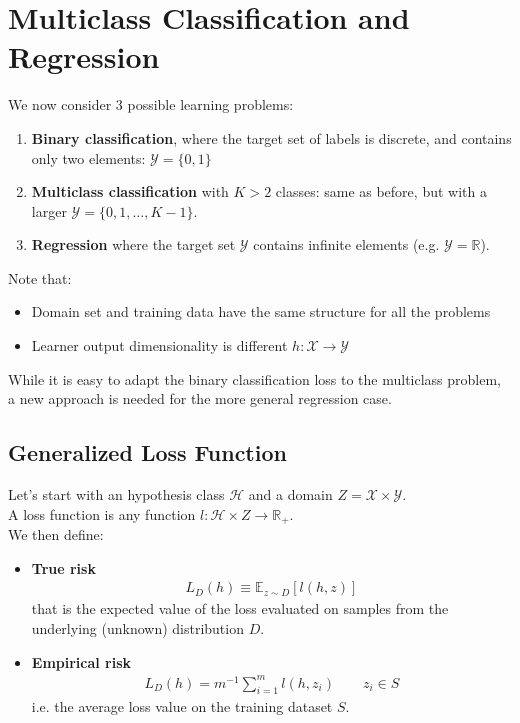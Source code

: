 \documentclass[../template.tex]{subfiles}
\begin{document}
\section{Multiclass Classification and Regression}
We now consider $3$ possible learning problems:
\begin{enumerate}
    \item \textbf{Binary classification}, where the target set of labels is discrete, and contains only two elements: $\mathcal{Y} = \{0,1\}$  
    \item \textbf{Multiclass classification} with $K>2$ classes: same as before, but with a larger $\mathcal{Y} = \{0, 1, \dots, K-1\}$.
    \item \textbf{Regression} where the target set $\mathcal{Y}$ contains infinite elements (e.g. $\mathcal{Y} = \mathbb{R}$).     
\end{enumerate}

Note that:
\begin{itemize}
    \item Domain set and training data have the same structure for all the problems
    \item Learner output dimensionality is different
    $h\colon \mathcal{X} \to \mathcal{Y}$ 
\end{itemize}
While it is easy to adapt the binary classification loss to the multiclass problem, a new approach is needed for the more general regression case.

\subsection{Generalized Loss Function}
Let's start with an hypothesis class $\mathcal{H}$ and a domain $Z = \mathcal{X}\times \mathcal{Y}$.\\
A loss function is any function $l\colon \mathcal{H}\times Z \to \mathbb{R}_+$.\\
We then define:
\begin{itemize}
    \item \textbf{True risk}
    \begin{align*}
        L_D (h) \equiv \mathbb{E}_{z \sim D}[l(h,z)]
    \end{align*}
    that is the expected value of the loss evaluated on samples from the underlying (unknown) distribution $D$.
    \item \textbf{Empirical risk}
    \begin{align*}
        L_D(h) = m^{-1} \sum_{i=1}^m l(h, z_i) \qquad z_i \in S
    \end{align*}
    i.e. the average loss value on the training dataset $S$. 
\end{itemize}
\end{document}
